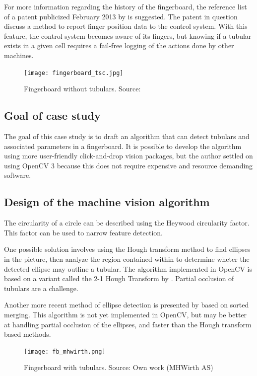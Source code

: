 For more information regarding the history of the fingerboard, the reference list of a patent publicized February 2013 by \citet{pat_james13} is suggested. The patent in question discuss a method to report finger position data to the control system. With this feature, the control system becomes aware of its fingers, but knowing if a tubular exists in a given cell requires a fail-free logging of the actions done by other machines.

\begin{figure}[ht]
    \centering
    \texttt{[image: fingerboard\_tsc.jpg]}
    \caption{Fingerboard without tubulars. Source:\cite{fig_fb_tsc15}}
    \label{fig:fb_tsc15}
\end{figure}
\FloatBarrier


\subsection{Goal of case study}
The goal of this case study is to draft an algorithm that can detect tubulars and associated parameters in a fingerboard. It is possible to develop the algorithm using more user-friendly click-and-drop vision packages, but the author settled on using OpenCV 3 because this does not require expensive and resource demanding software.

\subsection{Design of the machine vision algorithm}
The circularity of a circle can be described using the Heywood circularity factor. This factor can be used to narrow feature detection.

One possible solution involves using the Hough transform method to find ellipses in the picture, then analyze the region contained within to determine wheter the detected ellipse may outline a tubular. The algorithm implemented in OpenCV is based on a variant called the 2-1 Hough Transform by \citet{yuen90}. Partial occlusion of tubulars are a challenge.

Another more recent method of ellipse detection is presented by \citet{wang14} based on sorted merging. This algorithm is not yet implemented in OpenCV, but may be better at handling partial occlusion of the ellipses, and faster than the Hough transform based methods.

\begin{figure}[ht]
    \centering
    \texttt{[image: fb\_mhwirth.png]}
    \caption{Fingerboard with tubulars. Source: Own work (MHWirth AS)}
    \label{fig:fb_mhwirth}
\end{figure}
\FloatBarrier

